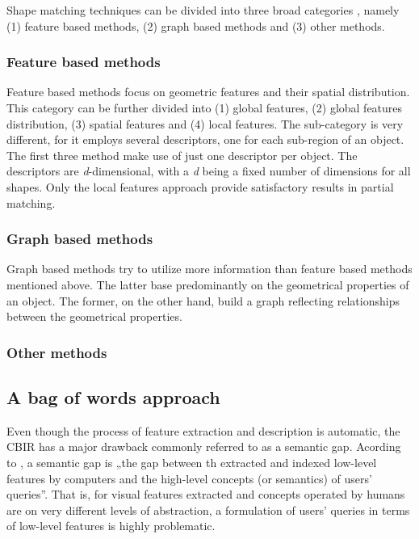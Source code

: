 \documentclass[a4paper,10pt]{article}
\begin{document}
  Shape matching techniques can be divided into three broad categories \cite{tangelder2008survey}, namely (1) feature based methods, (2) 
  graph based methods and (3) other methods.

\subsubsection{Feature based methods}

  Feature based methods focus on geometric features and their spatial distribution. This category can be further divided into (1) global features, 
  (2) global features distribution, (3) spatial features and (4) local features. The sub-category is very different, for it employs several 
  descriptors, one for each sub-region of an object. The first three method make use of just one descriptor per object. The descriptors are 
  \textit{d}-dimensional, with a \textit{d} being a fixed number of dimensions for all shapes. Only the local features approach provide satisfactory 
  results in partial matching.

\subsubsection{Graph based methods}

  Graph based methods try to utilize more information than feature based methods mentioned above. The latter base predominantly on the
  geometrical properties of an object. The former, on the other hand, build a graph reflecting relationships  between the geometrical
  properties. 


\subsubsection{Other methods}


\subsection{A bag of words approach}

  Even though the process of feature extraction and description is automatic, the CBIR has a major drawback commonly referred to
  as a semantic gap. Acording to \cite{tsai2012bag}, a semantic gap is „the gap between th extracted and indexed low-level features
  by computers and the high-level concepts (or semantics) of users' queries”. That is, for visual features extracted and concepts
  operated by humans are on very different levels of abstraction, a formulation of users' queries in terms of low-level features is
  highly problematic. 
\end{document}
